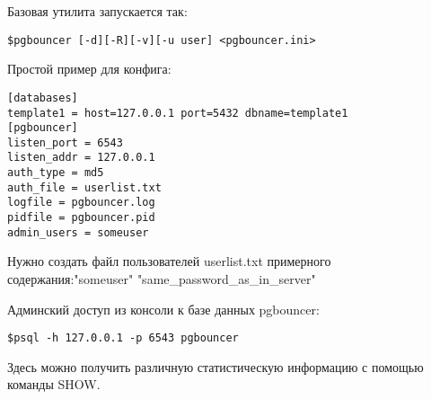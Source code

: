 Базовая утилита запускается так:
\begin{verbatim}
$pgbouncer [-d][-R][-v][-u user] <pgbouncer.ini>
\end{verbatim}

Простой пример для конфига:
\begin{verbatim}
[databases]
template1 = host=127.0.0.1 port=5432 dbname=template1
[pgbouncer]
listen_port = 6543
listen_addr = 127.0.0.1
auth_type = md5
auth_file = userlist.txt
logfile = pgbouncer.log
pidfile = pgbouncer.pid
admin_users = someuser
\end{verbatim}

Нужно создать файл пользователей userlist.txt примерного содержания:"someuser" "same\_password\_as\_in\_server"

Админский доступ из консоли к базе данных pgbouncer:
\begin{verbatim}
$psql -h 127.0.0.1 -p 6543 pgbouncer
\end{verbatim}

Здесь можно получить различную статистическую информацию с помощью команды SHOW.

